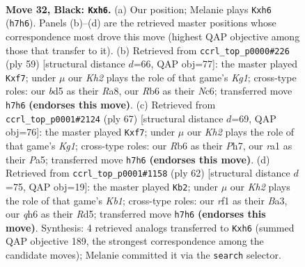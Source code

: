 \documentclass[11pt]{article}
\begin{document}
\clearpage

\begin{figure}[p]\centering
\begin{subfigure}{0.46\textwidth}\centering
\resizebox{\linewidth}{!}{%
\newchessgame
\chessboard[
  setfen={2b2r2/p6k/Pr1pPp1Q/2pB4/2P5/6P1/4N2K/R4R2 b - - 0 32},
  showmover=false,
  pgfstyle=straightmove, color=movearrow, markmove={h7-h6}
]}
\caption{}
\end{subfigure}\hfill
\begin{subfigure}{0.46\textwidth}\centering
\resizebox{\linewidth}{!}{%
\newchessgame
\chessboard[
  setfen={r3r1k1/5Qp1/2n1p3/2p1P3/p1P2P2/R7/2P4P/2B3RK b - - 0 30},
  showmover=false,
  pgfstyle=straightmove, color=movearrow, markmove={g8-f7}
]}
\caption{}
\end{subfigure}
\\[4pt]
\begin{subfigure}{0.46\textwidth}\centering
\resizebox{\linewidth}{!}{%
\newchessgame
\chessboard[
  setfen={6k1/3b1Qpp/1p1P4/p7/P2p2P1/4rPB1/7P/3R2K1 b - - 0 34},
  showmover=false,
  pgfstyle=straightmove, color=movearrow, markmove={g8-f7}
]}
\caption{}
\end{subfigure}\hfill
\begin{subfigure}{0.46\textwidth}\centering
\resizebox{\linewidth}{!}{%
\newchessgame
\chessboard[
  setfen={2r5/4bkpp/p1rp4/3Rp2P/4P3/BP3P2/2P1R3/1K6 w - - 1 32},
  showmover=false,
  pgfstyle=straightmove, color=movearrow, markmove={b1-b2}
]}
\caption{}
\end{subfigure}
\caption{\textbf{Move 32, Black: \texttt{Kxh6}.} (a) Our position; Melanie plays \texttt{Kxh6} (\texttt{h7h6}). Panels (b)--(d) are the retrieved master positions whose correspondence most drove this move (highest QAP objective among those that transfer to it). (b) Retrieved from \texttt{ccrl\_top\_p0000\#226} (ply 59) [structural distance $d$=66, QAP obj=77]: the master played \texttt{Kxf7}; under $\mu$ our \emph{Kh2} plays the role of that game's \emph{Kg1}; cross-type roles: our \emph{b}d5 as their \emph{R}a8, our \emph{R}b6 as their \emph{N}c6; transferred move \texttt{h7h6} \textbf{(endorses this move)}. (c) Retrieved from \texttt{ccrl\_top\_p0001\#2124} (ply 67) [structural distance $d$=69, QAP obj=76]: the master played \texttt{Kxf7}; under $\mu$ our \emph{Kh2} plays the role of that game's \emph{Kg1}; cross-type roles: our \emph{R}b6 as their \emph{P}h7, our \emph{r}a1 as their \emph{P}a5; transferred move \texttt{h7h6} \textbf{(endorses this move)}. (d) Retrieved from \texttt{ccrl\_top\_p0001\#1158} (ply 62) [structural distance $d$=75, QAP obj=19]: the master played \texttt{Kb2}; under $\mu$ our \emph{Kh2} plays the role of that game's \emph{Kb1}; cross-type roles: our \emph{r}f1 as their \emph{B}a3, our \emph{q}h6 as their \emph{R}d5; transferred move \texttt{h7h6} \textbf{(endorses this move)}. Synthesis: 4 retrieved analogs transferred to \texttt{Kxh6} (summed QAP objective 189, the strongest correspondence among the candidate moves); Melanie committed it via the \texttt{search} selector.}
\label{fig:thought-m63}
\end{figure}
\end{document}
